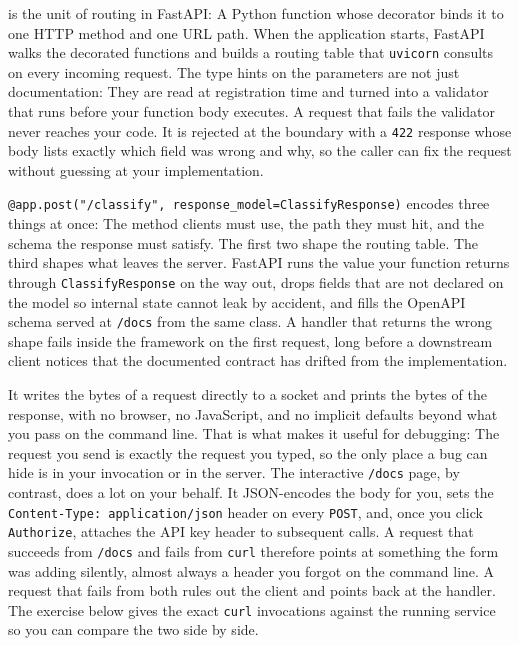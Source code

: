  is the unit of routing in FastAPI: A
Python function whose decorator binds it to one HTTP method and one URL
path. When the application starts, FastAPI walks the decorated functions
and builds a routing table that \texttt{uvicorn} consults on every
incoming request. The type hints on the parameters are not just
documentation: They are read at registration time and turned into a
validator that runs before your function body executes. A request that
fails the validator never reaches your code. It is rejected at the
boundary with a \texttt{422} response whose body lists exactly which
field was wrong and why, so the caller can fix the request without
guessing at your implementation.

\texttt{@app.post("/classify", response\_model=Classify\-Response)}
encodes three things at once: The method clients must use, the path they
must hit, and the schema the response must satisfy. The first two shape
the routing table. The third shapes what leaves the server. FastAPI runs
the value your function returns through \texttt{ClassifyResponse} on the
way out, drops fields that are not declared on the model so internal
state cannot leak by accident, and fills the OpenAPI schema served at
\texttt{/docs} from the same class. A handler that returns the wrong
shape fails inside the framework on the first request, long before a
downstream client notices that the documented contract has drifted from
the implementation.

It writes the bytes of a request directly to a socket and prints the
bytes of the response, with no browser, no JavaScript, and no implicit
defaults beyond what you pass on the command line. That is what makes it
useful for debugging: The request you send is exactly the request you
typed, so the only place a bug can hide is in your invocation or in the
server. The interactive \texttt{/docs} page, by contrast, does a lot on
your behalf. It JSON-encodes the body for you, sets the
\texttt{Content-\linebreak[1]Type: application/json} header on every
\texttt{POST}, and, once you click \texttt{Authorize}, attaches the API
key header to subsequent calls. A request that succeeds from
\texttt{/docs} and fails from \texttt{curl} therefore points at
something the form was adding silently, almost always a header you
forgot on the command line. A request that fails from both rules out
the client and points back at the handler. The exercise below gives the
exact \texttt{curl} invocations against the running service so you can
compare the two side by side.

